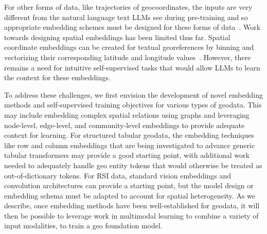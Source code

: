For other forms of data, like trajectories of geocoordinates, the inputs are very different from the natural language text LLMs see during pre-training and so appropriate embedding schemes must be designed for these forms of data~\cite{Hu2023}.
%
Work towards designing spatial embeddings has been limited thus far.
%
%
Spatial coordinate embeddings can be created for textual georeferences by binning and vectorizing their corresponding latitude and longitude values~\cite{Li2021}.
However, there remains a need for intuitive self-supervised tasks that would allow LLMs to learn the context for these embeddings.
%


To address these challenges, we first envision the development of novel embedding methods and self-supervised training objectives for various types of geodata.
This may include embedding complex spatial relations using graphs and leveraging node-level, edge-level, and community-level embeddings to provide adequate context for learning.
For structured tabular geodata, the embedding techniques like row and column embeddings that are being investigated to advance generic tabular transformers may provide a good starting point, with additional work needed to adequately handle geo entity tokens that would otherwise be treated as out-of-dictionary tokens.
For RSI data, standard vision embeddings and convolution architectures can provide a starting point, but the model design or embedding schema must be adapted to account for spatial heterogeneity.
%
As we describe, once embedding methods have been well-established for geodata, it will then be possible to leverage work in multimodal learning to combine a variety of input modalities, to train a geo foundation model.






